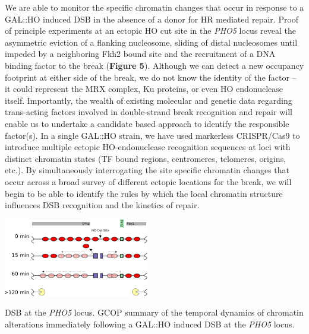 We are able to monitor the specific chromatin changes that occur in response to a GAL::HO induced DSB in the absence of a donor for HR mediated repair.  Proof of principle experiments at an ectopic HO cut site in the \textit{PHO5} locus reveal the asymmetric eviction of a flanking nucleosome, sliding of distal nucleosomes until impeded by a neighboring Fkh2 bound site and the recruitment of a DNA binding factor to the break ({\color{dukeblue}\textbf{Figure 5}}).  Although we can detect a new occupancy footprint at either side of the  break, we do not know the identity of the factor -- it could represent the MRX complex, Ku proteins, or even HO endonuclease itself. Importantly, the wealth of existing molecular and genetic data regarding trans-acting factors involved in double-strand break recognition and repair %
will enable us to undertake a %
candidate based approach to identify the responsible factor(s). In a single GAL::HO strain, we have used markerless CRISPR/Cas9\citep{Anand2017-dp} to introduce multiple ectopic HO-endonuclease recognition sequences at loci with distinct chromatin states (TF bound regions, centromeres, telomeres, origins, etc.). By simultaneously interrogating the site specific chromatin changes that occur across a broad survey of different ectopic locations for the break, we will begin to be able to identify the rules by which the local chromatin structure influences DSB recognition and the kinetics of repair.
\begin{floatingfigure}[r]{2.5in}
\vspace{-4mm}
\begin{center}
\includegraphics[width=2.5in]{r35_figures/cut_process.png}
\end{center}
\vspace{4mm}
\caption{DSB at the \textit{PHO5} locus. GCOP summary of the temporal dynamics of chromatin alterations immediately following a GAL::HO induced DSB at the \textit{PHO5} locus. }%
\end{floatingfigure}



